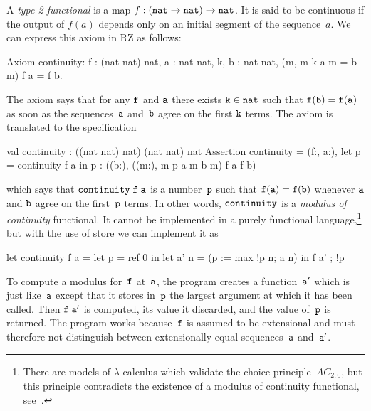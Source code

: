 A \emph{type 2 functional} is a map $f : (\mathtt{nat} \to \mathtt{nat})
\to \mathtt{nat}$. It is said to be continuous if the output of $f(a)$
depends only on an initial segment of the sequence~$a$. We can express
this axiom in RZ as follows:
%
\begin{source}
Axiom continuity: \iForall f : (nat \iTo nat) \iTo nat, \iForall a : nat \iTo nat,
  \iExists k, \iForall b : nat \iTo nat, (\iForall m, m \iLeq k \iTo a m = b m) \iTo f a = f b.
\end{source}
%
The axiom says that for any $\mathtt{f}$ and $\mathtt{a}$ there exists $\mathtt{k} \in
\mathtt{nat}$ such that $\mathtt{f(b) = f(a)}$ as soon as the sequences~$\mathtt{a}$
and~$\mathtt{b}$ agree on the first $\mathtt{k}$ terms. The axiom is translated to the
specification
%
\begin{source}
val continuity : ((nat \iTo nat) \iTo nat) \iTo (nat \iTo nat) \iTo nat
Assertion continuity =
  \iForall (f:, a:),
    let p = continuity f a in p :  \iAnd
    (\iForall (b:),
       (\iForall (m:),  m \iLeq p \iTo a m  b m) \iTo f a  f b)
\end{source}
%
which says that $\mathtt{continuity\;f\;a}$ is a number~$\mathtt{p}$ such that
$\mathtt{f(a) = f(b)}$ whenever $\mathtt{a}$ and $\mathtt{b}$ agree on the first~$\mathtt{p}$ terms. In
other words, $\mathtt{continuity}$ is a \emph{modulus of continuity}
functional. It cannot be implemented in a purely functional
language,\footnote{There are models of $\lambda$-calculus which validate
  the choice principle~$AC_{2,0}$, but this principle contradicts the
  existence of a modulus of continuity functional,
  see~\cite[9.6.10]{Troelstra:van-Dalen:88:2}.} but with the use of
store we can implement it as
%
\begin{source}
let continuity f a =
  let p = ref 0 in
  let a' n = (p := max !p n; a n) in
    f a' ; !p
\end{source}
%
To compute a modulus for~$\mathtt{f}$ at~$\mathtt{a}$, the program creates a
function~$\mathtt{a'}$ which is just like~$\mathtt{a}$ except that it stores in~$\mathtt{p}$ the
largest argument at which it has been called. Then $\mathtt{f\;a'}$ is
computed, its value it discarded, and the value of~$\mathtt{p}$ is returned.
The program works because~$\mathtt{f}$ is assumed to be extensional and must
therefore not distinguish between extensionally equal sequences~$\mathtt{a}$
and~$\mathtt{a'}$.



